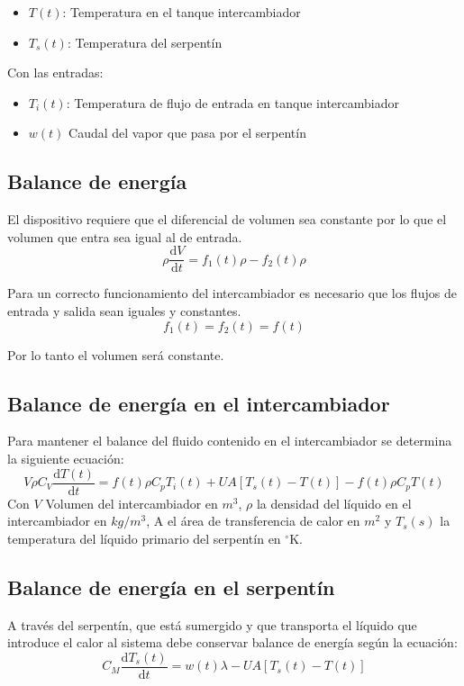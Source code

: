 \documentclass[12pt,letterpaper]{article}     %
\begin{document}
\begin{itemize}

\item $T(t)$: Temperatura en el tanque intercambiador
\item $T_s(t)$: Temperatura del serpentín
\end{itemize}

Con las entradas:
\begin{itemize}
\item $T_i(t)$: Temperatura de flujo de entrada en tanque intercambiador
\item $w(t)$ Caudal del vapor que pasa por el serpentín
\end{itemize}

\subsection{Balance de energía}
El dispositivo requiere que el diferencial de volumen sea constante por lo que el volumen que entra sea igual al de entrada.
\begin{equation}
\rho \frac{\mathrm{d} V }{\mathrm{d} t} = f_1 (t) \rho  - f_2 (t) \rho
\label{eq:volumen}
\end{equation}

Para un correcto funcionamiento del intercambiador es necesario que los flujos de entrada y salida sean iguales y constantes.
\begin{equation}
    f_1(t) = f_2(t) = f(t)
    \label{eq:Flujos}
\end{equation}

Por lo tanto el volumen será constante.

\subsection{Balance de energía en el intercambiador}
Para mantener el balance del fluido contenido en el intercambiador se determina la siguiente ecuación: \\
 \begin{equation}
V \rho C_{V}\frac{\mathrm{d} T(t)}{\mathrm{d} t}= f(t)\rho C_{p}T_{i}(t) +UA[T_{s}(t)-T(t)]-f(t)\rho C_{p}T(t)
\label{eq:BalanFlui}
 \end{equation}
Con $V$ Volumen del intercambiador en $m^3$, $\rho$ la densidad del líquido en el intercambiador en $kg/ m^3$, A el área de transferencia de calor en $m^2$ y $T_s(s)$ la temperatura del líquido primario del serpentín en $^{\circ}$K.

\subsection{Balance de energía en el serpentín}
A través del serpentín, que está sumergido y que transporta el líquido que introduce el calor al sistema debe conservar balance de energía según la ecuación: \\
\begin{equation}
C_{M}\frac{\mathrm{d} T_{s}(t)}{\mathrm{d} t} = w(t)\lambda - UA[T_s (t)- T(t)]
\label{eq:EnergSerp}
\end{equation}
\end{document}
